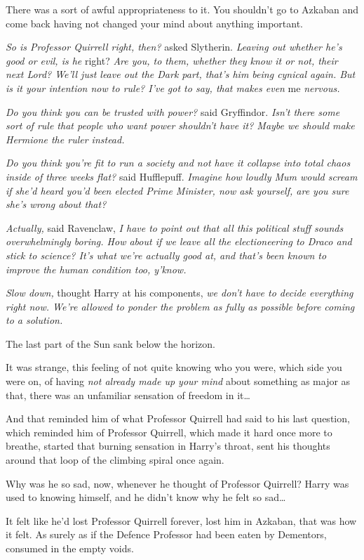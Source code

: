 There was a sort of awful appropriateness to it. You shouldn’t go to Azkaban and come back having not changed your mind about anything important.

\emph{So is Professor Quirrell right, then?} asked Slytherin. \emph{Leaving out whether he’s good or evil, is he} right? \emph{Are you, to them, whether they know it or not, their next Lord? We’ll just leave out the Dark part, that’s him being cynical again. But is it your intention now to rule? I’ve got to say, that makes even} me \emph{nervous.}

\emph{Do you think you can be trusted with power?} said Gryffindor. \emph{Isn’t there some sort of rule that people who want power shouldn’t have it? Maybe we should make Hermione the ruler instead.}

\emph{Do you think you’re fit to run a society and not have it collapse into total chaos inside of three weeks flat?} said Hufflepuff. \emph{Imagine how loudly Mum would scream if she’d heard you’d been elected Prime Minister, now ask yourself, are you sure she’s wrong about that?}

\emph{Actually,} said Ravenclaw, \emph{I have to point out that all this political stuff sounds overwhelmingly boring. How about if we leave all the electioneering to Draco and stick to science? It’s what we’re actually good at, and that’s been known to improve the human condition too, y’know.}

\emph{Slow down,} thought Harry at his components, \emph{we don’t have to decide everything right now. We’re allowed to ponder the problem as fully as possible before coming to a solution.}

The last part of the Sun sank below the horizon.

It was strange, this feeling of not quite knowing who you were, which side you were on, of having \emph{not already made up your mind} about something as major as that, there was an unfamiliar sensation of freedom in it…

And that reminded him of what Professor Quirrell had said to his last question, which reminded him of Professor Quirrell, which made it hard once more to breathe, started that burning sensation in Harry’s throat, sent his thoughts around that loop of the climbing spiral once again.

Why was he so sad, now, whenever he thought of Professor Quirrell? Harry was used to knowing himself, and he didn’t know why he felt so sad…

It felt like he’d lost Professor Quirrell forever, lost him in Azkaban, that was how it felt. As surely as if the Defence Professor had been eaten by Dementors, consumed in the empty voids.


